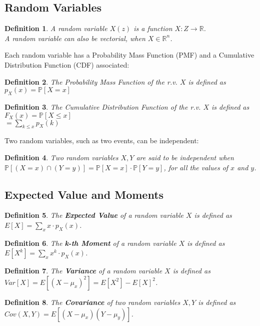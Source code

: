 \documentclass[12pt, a4paper, english]{report}
\newtheorem{definition}{Definition}
\begin{document}
\subsection{Random Variables}
\begin{definition}
    A random variable $X(z)$ is a function $X: Z \rightarrow \mathbb{R}$. \\
    A random variable can also be vectorial, when $X \in \mathbb{R}^{n}$.
\end{definition}
Each random variable has a Probability Mass Function (PMF) and a Cumulative Distribution
Function (CDF) associated:
\begin{definition}
    The Probability Mass Function of the r.v. $X$ is defined as\\$p_{X}(x) = \mathbb{P}[X = x]$
\end{definition}
\begin{definition}
    The Cumulative Distribution Function of the r.v. $X$ is defined as\\$F_{X}(x) = \mathbb{P}[X \leq x]$\\
    $= \sum_{k \leq x} p_{X}(k)$
\end{definition}
Two random variables, such as two events, can be independent:
\begin{definition}
    Two random variables $X, Y$ are said to be independent when\\$\mathbb{P}[(X = x) \cap (Y = y)] = \mathbb{P}[X = x] \cdot \mathbb{P}[Y = y]$, for all the values of $x$ and $y$.
\end{definition}
\subsection{Expected Value and Moments}
\begin{definition}
    The \textbf{Expected Value} of a random variable $X$ is defined as\\$E[X] = \sum_{x} x \cdot p_{X}(x)$.
\end{definition}
\begin{definition}
    The \textbf{k-th Moment} of a random variable $X$ is defined as\\$E[X^{k}] = \sum_{x} x^{k} \cdot p_{X}(x)$.
\end{definition}
\begin{definition}
    The \textbf{Variance} of a random variable $X$ is defined as\\$Var[X] = E[(X - \mu_{x})^{2}] = E[X^{2}] - E[X]^{2}$.
\end{definition}
\begin{definition}
    The \textbf{Covariance} of two random variables $X, Y$ is defined as\\$Cov(X,Y) = E[(X - \mu_{x})(Y - \mu_{y})]$.
\end{definition}
\end{document}
